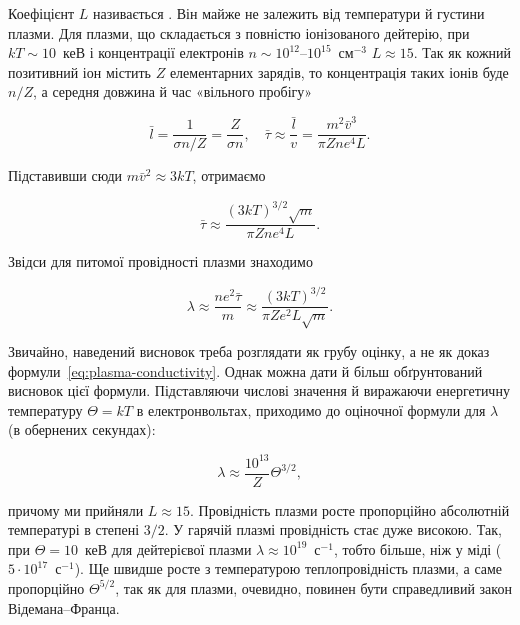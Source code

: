 Коефіцієнт $L$ називається . Він майже не залежить від температури й густини плазми. Для плазми, що складається з повністю іонізованого дейтерію, при $kT \sim 10$~кеВ і концентрації електронів $n \sim 10^{12}$--$10^{15}$~см$^{-3}$ $L \approx 15$. Так як кожний позитивний іон містить $Z$ елементарних зарядів, то концентрація таких іонів буде $n/Z$, а середня довжина й час «вільного пробігу»

\begin{equation*}
	\bar{l} = \frac{1}{\sigma n/Z} = \frac{Z}{\sigma n}, \quad \bar{\tau} \approx \frac{\bar{l}}{v} = \frac{m^2\bar{v}^3}{\pi Z n e^4 L}.
\end{equation*}

Підставивши сюди $m\bar{v}^2 \approx 3kT$, отримаємо

\begin{equation}\label{eq:relaxation-time}
	\bar{\tau} \approx \frac{(3kT)^{3/2}\sqrt{m}}{\pi Z n e^4 L}.
\end{equation}

Звідси для питомої провідності плазми знаходимо

\begin{equation}\label{eq:plasma-conductivity}
	\lambda \approx \frac{ne^2\bar{\tau}}{m} \approx \frac{(3kT)^{3/2}}{\pi Z e^2 L\sqrt{m}}.
\end{equation}

Звичайно, наведений висновок треба розглядати як грубу оцінку, а не як доказ формули~\eqref{eq:plasma-conductivity}. Однак можна дати й більш обґрунтований висновок цієї формули. Підставляючи числові значення й виражаючи енергетичну температуру $\Theta = kT$ в електронвольтах, приходимо до оціночної формули для $\lambda$ (в обернених секундах):

\begin{equation*}
	\lambda \approx \frac{10^{13}}{Z}\Theta^{3/2},
\end{equation*}

причому ми прийняли $L \approx 15$. Провідність плазми росте пропорційно абсолютній температурі в степені $3/2$. У гарячій плазмі провідність стає дуже високою. Так, при $\Theta = 10$~кеВ для дейтерієвої плазми $\lambda \approx 10^{19}$~с$^{-1}$, тобто більше, ніж у міді ($5\cdot10^{17}$~с$^{-1}$). Ще швидше росте з температурою теплопровідність плазми, а саме пропорційно $\Theta^{5/2}$, так як для плазми, очевидно, повинен бути справедливий закон Відемана--Франца.

